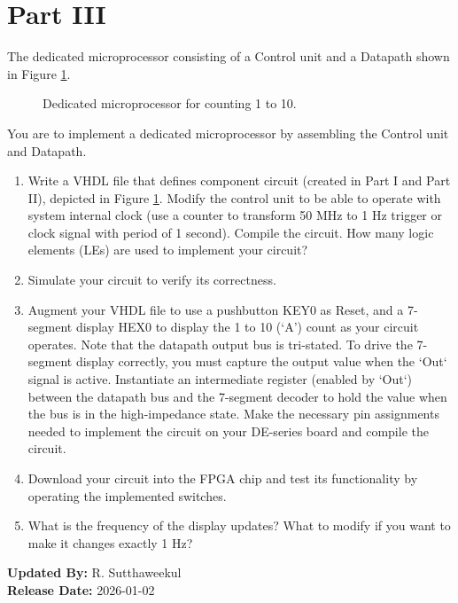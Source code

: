 \documentclass{article}
\begin{document}
\section*{Part III}

The dedicated microprocessor consisting of a Control unit and a Datapath shown in Figure \ref{fig:microprocessor}.

\begin{figure}[H]
    \centering
    \resizebox{\textwidth}{!}{}
    \caption{Dedicated microprocessor for counting 1 to 10.}
    \label{fig:microprocessor}
\end{figure}

You are to implement a dedicated microprocessor by assembling the Control unit and Datapath.

\begin{enumerate}
    \item Write a VHDL file that defines component circuit (created in Part I and Part II), depicted in Figure \ref{fig:microprocessor}. Modify the control unit to be able to operate with system internal clock (use a counter to transform 50 MHz to 1 Hz trigger or clock signal with period of 1 second). Compile the circuit. How many logic elements (LEs) are used to implement your circuit?
    \item Simulate your circuit to verify its correctness.
    \item Augment your VHDL file to use a pushbutton KEY0 as Reset, and a 7-segment display HEX0 to display the 1 to 10 (‘A’) count as your circuit operates. Note that the datapath output bus is tri-stated. To drive the 7-segment display correctly, you must capture the output value when the `Out` signal is active. Instantiate an intermediate register (enabled by `Out`) between the datapath bus and the 7-segment decoder to hold the value when the bus is in the high-impedance state. Make the necessary pin assignments needed to implement the circuit on your DE-series board and compile the circuit.
    \item Download your circuit into the FPGA chip and test its functionality by operating the implemented switches.
    \item What is the frequency of the display updates? What to modify if you want to make it changes exactly 1 Hz?
\end{enumerate}

\vspace{1cm}
\noindent \textbf{Updated By:} R. Sutthaweekul \\
\textbf{Release Date:} 2026-01-02
\end{document}
